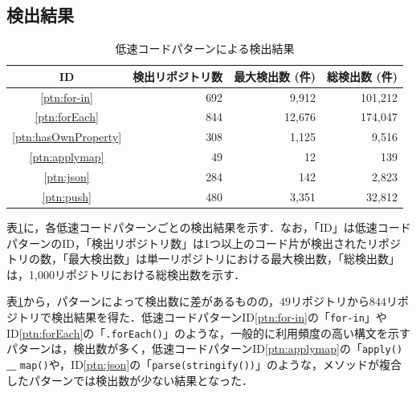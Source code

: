 \documentclass[11pt]{jreport}
\begin{document}
\subsection{検出結果}

\begin{table}[ht]
    \centering
    \caption{低速コードパターンによる検出結果}
    \label{tab:result_detect}
    \begin{tabular}{crrr}
        \toprule
        \textbf{ID} & \textbf{検出リポジトリ数} & \textbf{最大検出数 (件)} & \textbf{総検出数 (件)} \\
        \midrule           
        \ref{ptn:for-in} & 692 & 9,912 & 101,212 \\
        \ref{ptn:forEach} & 844 & 12,676 & 174,047 \\
        \ref{ptn:hasOwnProperty} & 308 & 1,125 & 9,516 \\
        \ref{ptn:applymap} & 49 & 12 & 139 \\
        \ref{ptn:json} & 284 & 142 & 2,823 \\
        \ref{ptn:push} & 480 & 3,351 & 32,812 \\
        \bottomrule
    \end{tabular}
\end{table}

表\ref{tab:result_detect}に，各低速コードパターンごとの検出結果を示す．なお，「ID」は低速コードパターンのID，「検出リポジトリ数」は1つ以上のコード片が検出されたリポジトリの数，「最大検出数」は単一リポジトリにおける最大検出数，「総検出数」は，1,000リポジトリにおける総検出数を示す．

表\ref{tab:result_detect}から，パターンによって検出数に差があるものの，$49$リポジトリから$844$リポジトリで検出結果を得た．低速コードパターンID\ref{ptn:for-in}の「\texttt{for-in}」やID\ref{ptn:forEach}の「\texttt{.forEach()}」のような，一般的に利用頻度の高い構文を示すパターンは，検出数が多く，低速コードパターンID\ref{ptn:applymap}の「\texttt{apply()} \textbf{\_} \texttt{map()}や，ID\ref{ptn:json}の「\texttt{parse(stringify())}」のような，メソッドが複合したパターンでは検出数が少ない結果となった．
\end{document}
